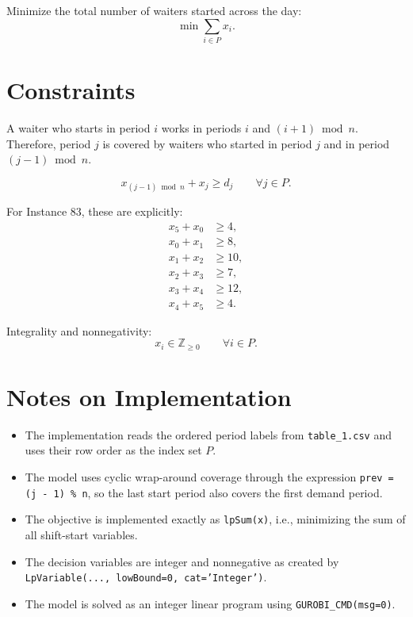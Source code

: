 Minimize the total number of waiters started across the day:
\[
\min \sum_{i \in P} x_i.
\]

\section*{Constraints}

A waiter who starts in period $i$ works in periods $i$ and $(i+1) \bmod n$. Therefore, period $j$ is covered by waiters who started in period $j$ and in period $(j-1) \bmod n$.

\[
x_{(j-1)\bmod n} + x_j \ge d_j
\qquad \forall j \in P.
\]

For Instance 83, these are explicitly:
\begin{align*}
x_5 + x_0 &\ge 4,\\
x_0 + x_1 &\ge 8,\\
x_1 + x_2 &\ge 10,\\
x_2 + x_3 &\ge 7,\\
x_3 + x_4 &\ge 12,\\
x_4 + x_5 &\ge 4.
\end{align*}

Integrality and nonnegativity:
\[
x_i \in \mathbb{Z}_{\ge 0}
\qquad \forall i \in P.
\]

\section*{Notes on Implementation}

\begin{itemize}
    \item The implementation reads the ordered period labels from \texttt{table\_1.csv} and uses their row order as the index set $P$.
    \item The model uses cyclic wrap-around coverage through the expression \texttt{prev = (j - 1) \% n}, so the last start period also covers the first demand period.
    \item The objective is implemented exactly as \texttt{lpSum(x)}, i.e., minimizing the sum of all shift-start variables.
    \item The decision variables are integer and nonnegative as created by \texttt{LpVariable(..., lowBound=0, cat='Integer')}.
    \item The model is solved as an integer linear program using \texttt{GUROBI\_CMD(msg=0)}.
\end{itemize}
